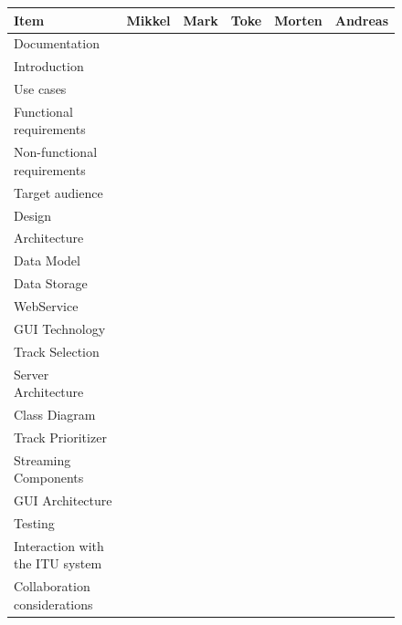 \documentclass[a4paper,11pt,report]{article}
\begin{document}
\begin{figure}[htp]
\begin{tabular}{| l | l | l | l | l | l |}
  \hline
  Item & Mikkel & Mark & Toke & Morten & Andreas \\
  \hline
  \multicolumn{6}{|l|}{Documentation} \\
  \hline
  Introduction &  &\cellcolor{Gray} &\cellcolor{Gray}&  & \\
  \hline
  Use cases & \cellcolor{Gray} & \cellcolor{Gray} & \cellcolor{Gray} & \cellcolor{Gray} & \cellcolor{Gray} \\
  \hline
  Functional requirements & \cellcolor{Gray} & \cellcolor{Gray} & \cellcolor{Gray} & \cellcolor{Gray} & \cellcolor{Gray} \\
  \hline
  Non-functional requirements & \cellcolor{Gray} &\cellcolor{Gray}  &  &  &  \\
  \hline
  Target audience &  &  &  &  & \cellcolor{Gray} \\
  \hline
  Design &  &  &  & \cellcolor{Gray} &  \\
  \hline
  Architecture & \cellcolor{Gray} & \cellcolor{Gray} &  &  &  \\
  \hline
  Data Model & \cellcolor{Gray} & \cellcolor{Gray} & \cellcolor{Gray} & \cellcolor{Gray} & \cellcolor{Gray} \\
  \hline
  Data Storage &  &  &  &  & \cellcolor{Gray} \\
  \hline
  WebService & \cellcolor{Gray} &  &  &  &  \\
  \hline
  GUI Technology &  &  & \cellcolor{Gray} &  &  \\
  \hline
  Track Selection &  & \cellcolor{Gray} &  &  &  \\
  \hline
  Server Architecture &  & \cellcolor{Gray} &  & \cellcolor{Gray} & \cellcolor{Gray} \\
  \hline
  Class Diagram &  &  &  & \cellcolor{Gray} &  \\
  \hline
  Track Prioritizer &  & \cellcolor{Gray} &  &  &  \\
  \hline
  Streaming Components & \cellcolor{Gray} & \cellcolor{Gray} &  &  &  \\
  \hline
  GUI Architecture &  &  &  &  & \cellcolor{Gray} \\
  \hline
  Testing &  & \cellcolor{Gray} &  & \cellcolor{Gray} &  \\
  \hline
  Interaction with the ITU system &  & \cellcolor{Gray} &  &  &  \\
  \hline
  Collaboration considerations &  &  & \cellcolor{Gray} &  &  \\

\end{tabular}
\end{figure}
\end{document}
